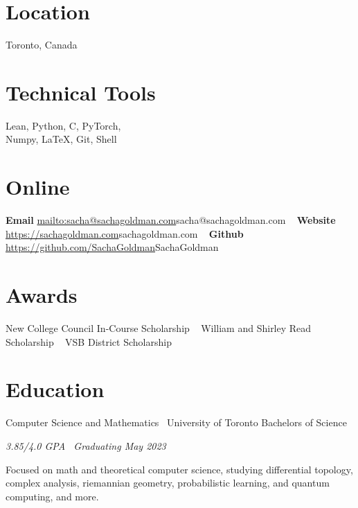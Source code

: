 \documentclass[]{style}
\begin{document}

\begin{aside} %
\section{Location}
Toronto, Canada
\section{Technical Tools}
Lean, Python, C, PyTorch, \\ Numpy, \LaTeX, Git, Shell
\section{Online}
\textbf{Email}
\url{mailto:sacha@sachagoldman.com}{sacha@sachagoldman.com} 
~ \vspace{-2mm}
\textbf{Website} 
\url{https://sachagoldman.com}{sachagoldman.com} 
~ \vspace{-2mm}
\textbf{Github}
\url{https://github.com/SachaGoldman}{SachaGoldman}
\section{Awards}
New College Council 
In-Course Scholarship
~ \vspace{-1mm}
William and Shirley Read 
Scholarship
~ \vspace{-1mm}
VSB District Scholarship
\end{aside}

\section{Education}

\begin{entrylist}

\entry
{Computer Science and Mathematics \ {\normalfont University of Toronto}}
{Bachelors of Science}
{\emph{3.85/4.0 GPA \ Graduating May 2023}
~ \vspace{1mm}

Focused on math and theoretical computer science, studying differential topology, complex analysis, riemannian geometry, probabilistic learning, and quantum computing, and more.}

\end{entrylist}
\end{document}
